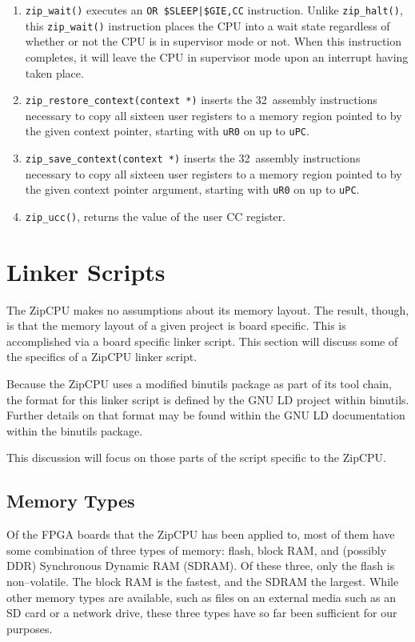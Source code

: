 \documentclass{gqtekspec}
\begin{document}
\begin{enumerate}
\item {\tt zip\_wait()} executes an \hbox{\tt OR \$SLEEP|\$GIE,CC} instruction.
	Unlike {\tt zip\_halt()}, this {\tt zip\_wait()} instruction places
	the CPU into a wait state regardless of whether or not the CPU is
	in supervisor mode or not.   When this instruction completes, it will
	leave the CPU in supervisor mode upon an interrupt having taken place.

\item {\tt zip\_restore\_context(context *)} inserts the 32~assembly
	instructions necessary to copy all sixteen user registers to a memory
	region pointed to by the given context pointer, starting with {\tt uR0}
	on up to {\tt uPC}.

\item {\tt zip\_save\_context(context *)} inserts the 32~assembly instructions
	necessary to copy all sixteen user registers to a memory region pointed
	to by the given context pointer argument, starting
	with {\tt uR0} on up to {\tt uPC}.
\item {\tt zip\_ucc()}, returns the value of the user CC register.
\end{enumerate}
%
\section{Linker Scripts}\label{sec:ld}
The ZipCPU makes no assumptions about its memory layout.  The result, though,
is that the memory layout of a given project is board specific.  This
is accomplished via a board specific linker script.  This section will discuss
some of the specifics of a ZipCPU linker script.

Because the ZipCPU uses a modified binutils package as part of its tool chain,
the format for this linker script is defined by the GNU LD project within
binutils.  Further details on that format may be found within the GNU LD 
documentation within the binutils package.

This discussion will focus on those parts of the script specific to the ZipCPU.

\subsection{Memory Types}\label{sec:ld-mem}
Of the FPGA boards that the ZipCPU has been applied to, most of them have some
combination of three types of memory: flash, block RAM, and (possibly DDR)
Synchronous Dynamic RAM (SDRAM).  Of these three, only the flash is
non--volatile.  The block RAM is the fastest, and the SDRAM the largest.
While other memory types are available, such as files on an external media
such as an SD card or a network drive, these three types have so far been
sufficient for our purposes.
\end{document}
